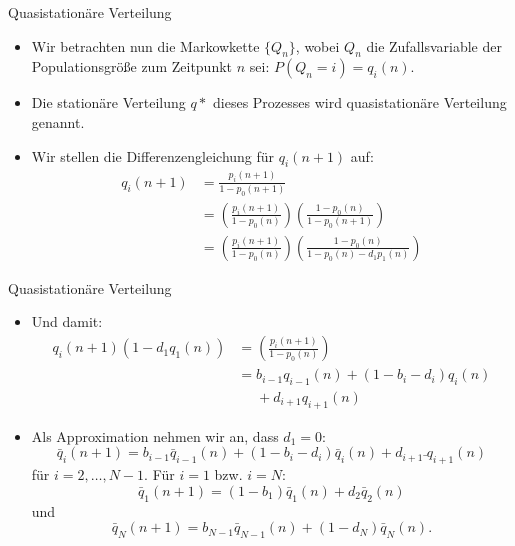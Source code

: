 \documentclass{beamer}
\newcommand\relphantom[1]{\mathrel{\phantom{#1}}}
\begin{document}
\begin{frame}{Quasistationäre Verteilung}
  \begin{itemize}
  \item Wir betrachten nun die Markowkette $\{Q_n\}$, wobei $Q_n$ die Zufallsvariable der Populationsgröße zum Zeitpunkt $n$ sei: $P(Q_n = i) = q_i(n)$.
  \item Die stationäre Verteilung $q*$ dieses Prozesses wird quasistationäre Verteilung genannt.
  \item Wir stellen die Differenzengleichung für $q_i(n+1)$ auf:
    \begin{align*}
      q_i(n+1) &= \frac{p_i(n+1)}{1-p_0(n+1)} \\
               &= \left(\frac{p_i(n+1)}{1-p_0(n)}\right)\left(\frac{1-p_0(n)}{1-p_0(n+1)}\right) \\
               &= \left(\frac{p_i(n+1)}{1-p_0(n)}\right)\left(\frac{1-p_0(n)}{1-p_0(n)-d_1p_1(n)}\right)
    \end{align*}
  \end{itemize}
\end{frame}
\begin{frame}{Quasistationäre Verteilung}
  \begin{itemize}
  \item Und damit:
    \begin{align*}
      q_i(n+1)(1-d_1q_1(n)) &= \left(\frac{p_i(n+1)}{1-p_0(n)}\right) \\
                            &= b_{i-1}q_{i-1}(n) + (1-b_i-d_i)q_i(n) \\
                            &\relphantom{=}{} + d_{i+1}q_{i+1}(n)
    \end{align*}
   \item Als Approximation nehmen wir an, dass $d_1 = 0$:
     \[
       \bar{q}_i(n+1) = b_{i-1}\bar{q}_{i-1}(n) + (1 - b_i - d_i)\bar{q}_i(n) + d_{i+1}\bar{~}{q}_{i+1}(n)
     \]
     für $i = 2,\dots, N-1$. Für $i = 1$ bzw{.} $i = N$:
     \[
       \bar{q}_1(n+1) = (1 - b_1)\bar{q}_1(n) + d_2\bar{q}_2(n)
     \]
     und
     \[
       \bar{q}_N(n+1) = b_{N-1}\bar{q}_{N-1}(n) + (1-d_N)\bar{q}_N(n).
     \]
  \end{itemize}
\end{frame}
\end{document}
